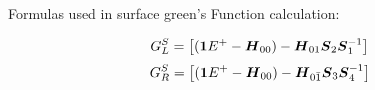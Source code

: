 Formulas used in surface green's Function calculation:

\begin{equation}
	G_{L}^{S}= \left[(\boldsymbol{1}E^{+}-\boldsymbol{H}_{00}) -\boldsymbol{H}_{01}\boldsymbol{S}_{2}\boldsymbol{S}_{1}^{-1}\right]
	\label{surfgreenleft}
\end{equation}
\begin{equation}
	G_{R}^{S}= \left[(\boldsymbol{1}E^{+}-\boldsymbol{H}_{00}) -\boldsymbol{H}_{0\bar{1}}\boldsymbol{S}_{3}\boldsymbol{S}_{4}^{-1}\right]
	\label{surfgreenright}
\end{equation}
\clearpage




